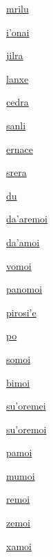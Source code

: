 {\hyperlink{val:mrilu}{mrilu}}{}{}{}

{\hyperlink{val:ihonai}{i'onai}}{}{}{}

{\hyperlink{val:jilra}{jilra}}{}{}{}

{\hyperlink{val:lanxe}{lanxe}}{}{}{}

{\hyperlink{val:cedra}{cedra}}{}{}{}

{\hyperlink{val:sanli}{sanli}}{}{}{}

{\hyperlink{val:ernace}{ernace}}{}{}{}

{\hyperlink{val:srera}{srera}}{}{}{}

{\hyperlink{val:du}{du}}{}{}{}

{\hyperlink{val:daharemoi}{da'aremoi}}{}{}{}

{\hyperlink{val:dahamoi}{da'amoi}}{}{}{}

{\hyperlink{val:vomoi}{vomoi}}{}{}{}

{\hyperlink{val:panomoi}{panomoi}}{}{}{}

{\hyperlink{val:pirosihe}{pirosi'e}}{}{}{}

{\hyperlink{val:po}{po}}{}{}{}

{\hyperlink{val:somoi}{somoi}}{}{}{}

{\hyperlink{val:bimoi}{bimoi}}{}{}{}

{\hyperlink{val:suhoremei}{su'oremei}}{}{}{}

{\hyperlink{val:suhoremoi}{su'oremoi}}{}{}{}

{\hyperlink{val:pamoi}{pamoi}}{}{}{}

{\hyperlink{val:mumoi}{mumoi}}{}{}{}

{\hyperlink{val:remoi}{remoi}}{}{}{}

{\hyperlink{val:zemoi}{zemoi}}{}{}{}

{\hyperlink{val:xamoi}{xamoi}}{}{}{}

